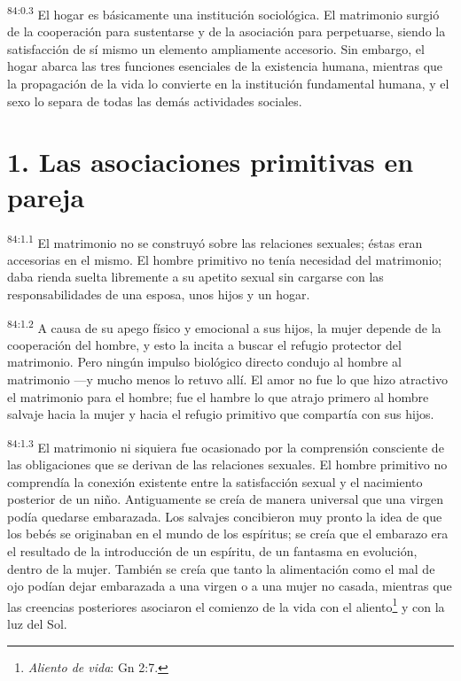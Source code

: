 \documentclass[twoside, 11pt]{book}
\begin{document}
\par
\textsuperscript{84:0.3} El hogar es básicamente una institución sociológica. El matrimonio surgió de la cooperación para sustentarse y de la asociación para perpetuarse, siendo la satisfacción de sí mismo un elemento ampliamente accesorio. Sin embargo, el hogar abarca las tres funciones esenciales de la existencia humana, mientras que la propagación de la vida lo convierte en la institución fundamental humana, y el sexo lo separa de todas las demás actividades sociales.

\section*{1. Las asociaciones primitivas en pareja}
\par
\textsuperscript{84:1.1} El matrimonio no se construyó sobre las relaciones sexuales; éstas eran accesorias en el mismo. El hombre primitivo no tenía necesidad del matrimonio; daba rienda suelta libremente a su apetito sexual sin cargarse con las responsabilidades de una esposa, unos hijos y un hogar.

\par
\textsuperscript{84:1.2} A causa de su apego físico y emocional a sus hijos, la mujer depende de la cooperación del hombre, y esto la incita a buscar el refugio protector del matrimonio. Pero ningún impulso biológico directo condujo al hombre al matrimonio ---y mucho menos lo retuvo allí. El amor no fue lo que hizo atractivo el matrimonio para el hombre; fue el hambre lo que atrajo primero al hombre salvaje hacia la mujer y hacia el refugio primitivo que compartía con sus hijos.

\par
\textsuperscript{84:1.3} El matrimonio ni siquiera fue ocasionado por la comprensión consciente de las obligaciones que se derivan de las relaciones sexuales. El hombre primitivo no comprendía la conexión existente entre la satisfacción sexual y el nacimiento posterior de un niño. Antiguamente se creía de manera universal que una virgen podía quedarse embarazada. Los salvajes concibieron muy pronto la idea de que los bebés se originaban en el mundo de los espíritus; se creía que el embarazo era el resultado de la introducción de un espíritu, de un fantasma en evolución, dentro de la mujer. También se creía que tanto la alimentación como el mal de ojo podían dejar embarazada a una virgen o a una mujer no casada, mientras que las creencias posteriores asociaron el comienzo de la vida con el aliento\footnote{\textit{Aliento de vida}: Gn 2:7.} y con la luz del Sol.
\end{document}

